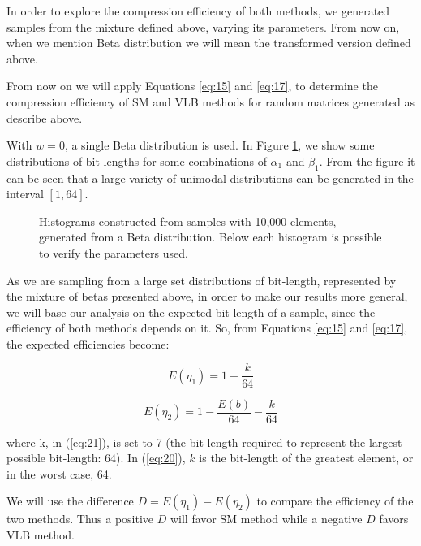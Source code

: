 \documentclass[10pt]{article}
\begin{document}
In order to explore the compression efficiency of both methods, we generated samples from the mixture defined above, varying its parameters. From now on, when we mention Beta distribution we will mean the transformed version defined above.

From now on we will apply Equations \ref{eq:15} and \ref{eq:17}, to determine the compression efficiency of SM and VLB methods for random matrices generated as describe above. 

With $w=0$, a single Beta distribution is used. In Figure \ref{fig:01020304}, we show some distributions of bit-lengths for some combinations of $\alpha_1$ and $\beta_1$. From the figure it can be seen that a large variety of unimodal distributions can be generated in the interval $[1,64]$.
 

\begin{figure}[ht]
  \centering
  \subfigure[$\alpha=1,\beta_1=1$]{
  }
  \subfigure[$\alpha=1,\beta=32$]{
  }
  \subfigure[$\alpha=32,\beta=1$]{
  }
  \subfigure[$\alpha=64,\beta=64$]{
  }
  \caption{Histograms constructed from samples with 10,000 elements, generated from a Beta distribution. Below each histogram is possible to verify the parameters used.}
  \label{fig:01020304}
\end{figure}

As we are sampling from a large set distributions of bit-length, represented by the mixture of betas presented above, in order to make our results more general, we will base our analysis on the expected bit-length of a sample, since the efficiency of both methods depends on it. So, from Equations \ref{eq:15} and \ref{eq:17}, the expected efficiencies become: 
 
\begin{equation}\label{eq:20}
 E(\eta_1) = 1 - \frac{k}{64}
\end{equation}

\begin{equation}\label{eq:21}
 E(\eta_2) = 1 - \frac{E(b)}{64} - \frac{k}{64}
\end{equation}

\noindent where k, in (\ref{eq:21}), is set to 7 (the bit-length required to represent the largest possible bit-length: 64). In (\ref{eq:20}), $k$ is the bit-length of the greatest element, or in the worst case, 64.

We will use the difference $D=E(\eta_1)-E(\eta_2)$ to compare the efficiency of the two methods. Thus a positive $D$ will favor SM method while a negative $D$ favors VLB method.
\end{document}
